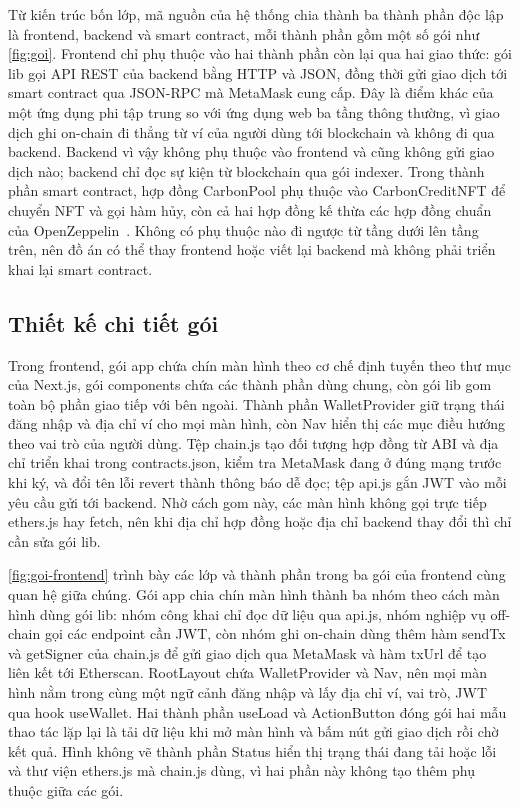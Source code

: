 Từ kiến trúc bốn lớp, mã nguồn của hệ thống chia thành ba thành phần độc lập là frontend, backend và smart contract, mỗi thành phần gồm một số gói như \autoref{fig:goi}. Frontend chỉ phụ thuộc vào hai thành phần còn lại qua hai giao thức: gói lib gọi API REST của backend bằng HTTP và JSON, đồng thời gửi giao dịch tới smart contract qua JSON-RPC mà MetaMask cung cấp. Đây là điểm khác của một ứng dụng phi tập trung so với ứng dụng web ba tầng thông thường, vì giao dịch ghi on-chain đi thẳng từ ví của người dùng tới blockchain và không đi qua backend. Backend vì vậy không phụ thuộc vào frontend và cũng không gửi giao dịch nào; backend chỉ đọc sự kiện từ blockchain qua gói indexer. Trong thành phần smart contract, hợp đồng CarbonPool phụ thuộc vào CarbonCreditNFT để chuyển NFT và gọi hàm hủy, còn cả hai hợp đồng kế thừa các hợp đồng chuẩn của OpenZeppelin~\cite{openzeppelin2024contracts}. Không có phụ thuộc nào đi ngược từ tầng dưới lên tầng trên, nên đồ án có thể thay frontend hoặc viết lại backend mà không phải triển khai lại smart contract.

\HinhGoi

\subsection*{Thiết kế chi tiết gói}
\label{subsec:tk-chitietgoi}

Trong frontend, gói app chứa chín màn hình theo cơ chế định tuyến theo thư mục của Next.js, gói components chứa các thành phần dùng chung, còn gói lib gom toàn bộ phần giao tiếp với bên ngoài. Thành phần WalletProvider giữ trạng thái đăng nhập và địa chỉ ví cho mọi màn hình, còn Nav hiển thị các mục điều hướng theo vai trò của người dùng. Tệp chain.js tạo đối tượng hợp đồng từ ABI và địa chỉ triển khai trong contracts.json, kiểm tra MetaMask đang ở đúng mạng trước khi ký, và đổi tên lỗi revert thành thông báo dễ đọc; tệp api.js gắn JWT vào mỗi yêu cầu gửi tới backend. Nhờ cách gom này, các màn hình không gọi trực tiếp ethers.js hay fetch, nên khi địa chỉ hợp đồng hoặc địa chỉ backend thay đổi thì chỉ cần sửa gói lib.

\autoref{fig:goi-frontend} trình bày các lớp và thành phần trong ba gói của frontend cùng quan hệ giữa chúng. Gói app chia chín màn hình thành ba nhóm theo cách màn hình dùng gói lib: nhóm công khai chỉ đọc dữ liệu qua api.js, nhóm nghiệp vụ off-chain gọi các endpoint cần JWT, còn nhóm ghi on-chain dùng thêm hàm sendTx và getSigner của chain.js để gửi giao dịch qua MetaMask và hàm txUrl để tạo liên kết tới Etherscan. RootLayout chứa WalletProvider và Nav, nên mọi màn hình nằm trong cùng một ngữ cảnh đăng nhập và lấy địa chỉ ví, vai trò, JWT qua hook useWallet. Hai thành phần useLoad và ActionButton đóng gói hai mẫu thao tác lặp lại là tải dữ liệu khi mở màn hình và bấm nút gửi giao dịch rồi chờ kết quả. Hình không vẽ thành phần Status hiển thị trạng thái đang tải hoặc lỗi và thư viện ethers.js mà chain.js dùng, vì hai phần này không tạo thêm phụ thuộc giữa các gói.

